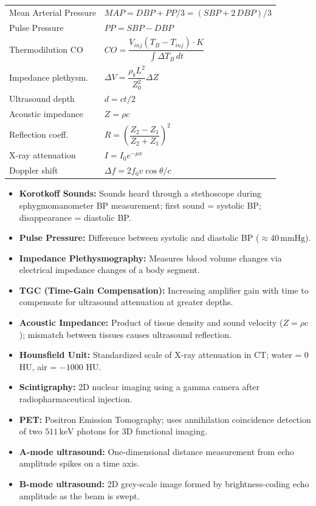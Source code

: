 \documentclass[12pt,a4paper]{article}
\renewcommand{\arraystretch}{1.45}
\begin{document}
\begin{tcolorbox}[formulabox, title={\textbf{Key Formulas}}]
\renewcommand{\arraystretch}{1.3}
\begin{tabularx}{\linewidth}{B{4.0cm} X}
Mean Arterial Pressure & $MAP = DBP + PP/3 = (SBP + 2\,DBP)/3$ \\[4pt]
Pulse Pressure & $PP = SBP - DBP$ \\[4pt]
Thermodilution CO & $CO = \dfrac{V_{inj}(T_B - T_{inj})\cdot K}{\int \Delta T_B\,dt}$ \\[8pt]
Impedance plethysm. & $\Delta V = \dfrac{\rho_b L^2}{Z_0^2}\Delta Z$ \\[8pt]
Ultrasound depth & $d = ct/2$ \\[4pt]
Acoustic impedance & $Z = \rho c$ \\[4pt]
Reflection coeff. & $R = \left(\dfrac{Z_2-Z_1}{Z_2+Z_1}\right)^2$ \\[8pt]
X-ray attenuation & $I = I_0 e^{-\mu x}$ \\[4pt]
Doppler shift & $\Delta f = 2f_0 v\cos\theta / c$
\end{tabularx}
\end{tcolorbox}

\begin{tcolorbox}[defbox, title={\textbf{One-Line Definitions}}]
\begin{itemize}[leftmargin=*, itemsep=2.5pt, topsep=0pt]
  \item \textbf{Korotkoff Sounds:} Sounds heard through a stethoscope during sphygmomanometer BP measurement; first sound = systolic BP; disappearance = diastolic BP.
  \item \textbf{Pulse Pressure:} Difference between systolic and diastolic BP ($\approx 40\,\text{mmHg}$).
  \item \textbf{Impedance Plethysmography:} Measures blood volume changes via electrical impedance changes of a body segment.
  \item \textbf{TGC (Time-Gain Compensation):} Increasing amplifier gain with time to compensate for ultrasound attenuation at greater depths.
  \item \textbf{Acoustic Impedance:} Product of tissue density and sound velocity ($Z = \rho c$); mismatch between tissues causes ultrasound reflection.
  \item \textbf{Hounsfield Unit:} Standardized scale of X-ray attenuation in CT; water = 0 HU, air = $-1000$ HU.
  \item \textbf{Scintigraphy:} 2D nuclear imaging using a gamma camera after radiopharmaceutical injection.
  \item \textbf{PET:} Positron Emission Tomography; uses annihilation coincidence detection of two $511\,\text{keV}$ photons for 3D functional imaging.
  \item \textbf{A-mode ultrasound:} One-dimensional distance measurement from echo amplitude spikes on a time axis.
  \item \textbf{B-mode ultrasound:} 2D grey-scale image formed by brightness-coding echo amplitude as the beam is swept.
\end{itemize}
\end{tcolorbox}
\end{document}

